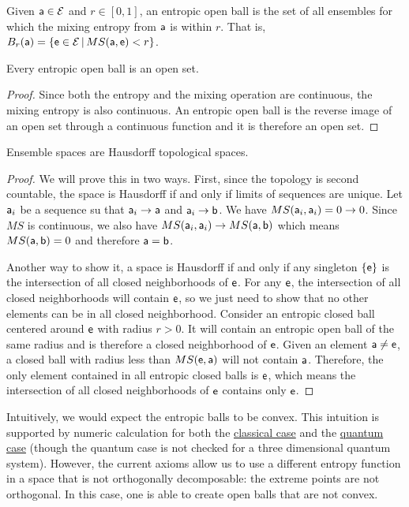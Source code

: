 \begin{mathSection}
\begin{defn}
	Given $\ens[a] \in \Ens$ and $r \in [0,1]$, an entropic open ball is the set of all ensembles for which the mixing entropy from $\ens[a]$ is within $r$. That is, $B_r(\ens[a]) = \{\ens \in \Ens \, | \, MS(\ens[a], \ens) < r\}$.
\end{defn}
\begin{coro}
	Every entropic open ball is an open set.
\end{coro}

\begin{proof}
	Since both the entropy and the mixing operation are continuous, the mixing entropy is also continuous. An entropic open ball is the reverse image of an open set through a continuous function and it is therefore an open set.
\end{proof}

\begin{prop}
	Ensemble spaces are Hausdorff topological spaces.
\end{prop}

\begin{proof}
	We will prove this in two ways. First, since the topology is second countable, the space is Hausdorff if and only if limits of sequences are unique. Let $\ens[a]_i$ be a sequence su that $\ens[a]_i \to \ens[a]$ and $\ens[a]_i \to \ens[b]$. We have $MS(\ens[a]_i, \ens[a]_i) = 0 \to 0$. Since $MS$ is continuous, we also have $MS(\ens[a]_i, \ens[a]_i) \to MS(\ens[a], \ens[b])$ which means $MS(\ens[a], \ens[b]) = 0$ and therefore $\ens[a] = \ens[b]$.
	
	Another way to show it, a space is Hausdorff if and only if any singleton $\{\ens\}$ is the intersection of all closed neighborhoods of $\ens$. For any $\ens$, the intersection of all closed neighborhoods will contain $\ens$, so we just need to show that no other elements can be in all closed neighborhood. Consider an entropic closed ball centered around $\ens$ with radius $r>0$. It will contain an entropic open ball of the same radius and is therefore a closed neighborhood of $\ens$. Given an element $\ens[a] \neq \ens$, a closed ball with radius less than $MS(\ens, \ens[a])$ will not contain $\ens[a]$. Therefore, the only element contained in all entropic closed balls is $\ens$, which means the intersection of all closed neighborhoods of $\ens$ contains only $\ens$.
\end{proof}

\begin{remark}
	Intuitively, we would expect the entropic balls to be convex. This intuition is supported by numeric calculation for both the \href{https://www.desmos.com/calculator/ama0u3u31d}{classical case} and the \href{https://www.desmos.com/calculator/6ga2hygwmm}{quantum case} (though the quantum case is not checked for a three dimensional quantum system). However, the current axioms allow us to use a different entropy function in a space that is not orthogonally decomposable: the extreme points are not orthogonal. In this case, one is able to create open balls that are not convex.
	

\end{remark}
\end{mathSection}
